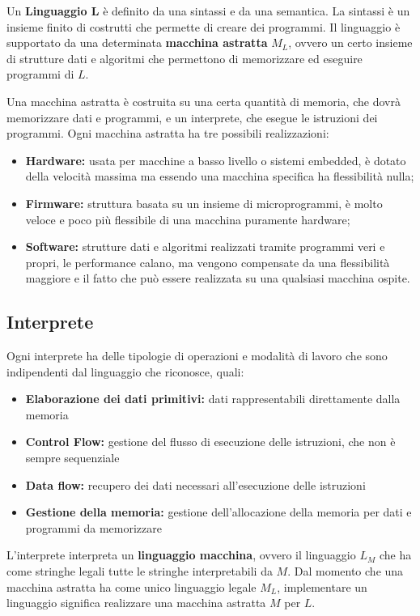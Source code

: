 \documentclass[a4paper, 10pt]{article}
\begin{document}
	Un \textbf{Linguaggio L} è definito da una sintassi e da una semantica. La sintassi è un insieme finito di costrutti che permette di creare dei programmi. Il linguaggio è supportato da una determinata \textbf{macchina astratta} $M_L$, ovvero un certo insieme di strutture dati e algoritmi che permettono di memorizzare ed eseguire programmi di $L$.
	
	Una macchina astratta è costruita su una certa quantità di memoria, che dovrà memorizzare dati e programmi, e un interprete, che esegue le istruzioni dei programmi.
	Ogni macchina astratta ha tre possibili realizzazioni:
	\begin{itemize}
		\item \textbf{Hardware:} usata per macchine a basso livello o sistemi embedded, è dotato della velocità massima ma essendo una macchina specifica ha flessibilità nulla;
		\item \textbf{Firmware:} struttura basata su un insieme di microprogrammi, è molto veloce e poco più flessibile di una macchina puramente hardware;
		\item \textbf{Software:} strutture dati e algoritmi realizzati tramite programmi veri e propri, le performance calano, ma vengono compensate da una flessibilità maggiore e il fatto che può essere realizzata su una qualsiasi macchina ospite.
	\end{itemize}
	
	\subsection{Interprete}
	Ogni interprete ha delle tipologie di operazioni e modalità di lavoro che sono indipendenti dal linguaggio che riconosce, quali:
	\begin{itemize}
		\item \textbf{Elaborazione dei dati primitivi:} dati rappresentabili direttamente dalla memoria
		\item \textbf{Control Flow:} gestione del flusso di esecuzione delle istruzioni, che non è sempre sequenziale
		\item \textbf{Data flow:} recupero dei dati necessari all'esecuzione delle istruzioni
		\item \textbf{Gestione della memoria:} gestione dell'allocazione della memoria per dati e programmi da memorizzare
	\end{itemize}
	
	L'interprete interpreta un \textbf{linguaggio macchina}, ovvero il linguaggio $L_M$ che ha come stringhe legali tutte le stringhe interpretabili da $M$. Dal momento che una macchina astratta ha come unico linguaggio legale $M_L$, implementare un linguaggio significa realizzare una macchina astratta $M$ per $L$.\\
	
\end{document}
